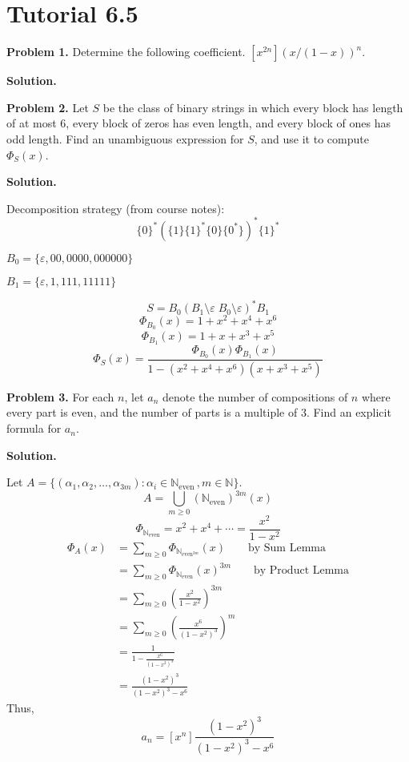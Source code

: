 \section{Tutorial 6.5}
\textbf{Problem 1.} Determine the following coefficient.
$ [x^{2n}](x/(1-x))^n $.

\textbf{Solution.}

\textbf{Problem 2.} Let $ S $ be the class of binary strings in which every
block has length of at most $ 6 $, every block of zeros has even length,
and every block of ones has odd length. Find an unambiguous expression for $ S $,
and use it to compute $ \Phi_S(x) $.

\textbf{Solution.}

Decomposition strategy (from course notes):
\[ \{0\}^*(\{1\}\{1\}^*\{0\}\{0^*\})^*\{1\}^* \]

$ B_0=\{\varepsilon,00,0000,000000\} $

$ B_1=\{\varepsilon, 1, 111, 11111\} $

\[ S=B_0(B_1\setminus \varepsilon\; B_0\setminus \varepsilon)^* B_1 \]
\[ \Phi_{B_0}(x)=1+x^2+x^4+x^6 \]
\[ \Phi_{B_1}(x)=1+x+x^3+x^5 \]
\[ \Phi_S(x)=\frac{\Phi_{B_0}(x)\Phi_{B_1}(x)}{1-(x^2+x^4+x^6)(x+x^3+x^5)} \]


\textbf{Problem 3.} For each $ n $, let $ a_n $ denote the number of compositions
of $ n $ where every part is even, and the number of parts is a multiple of $ 3 $.
Find an explicit formula for $ a_n $.

\textbf{Solution.}

Let $ A= \{(\alpha_1,\alpha_2,\ldots,\alpha_{3m}):
    \alpha_i\in\mathbb{N}_{\text{even}}\,, m\in\mathbb{N}\} $.
\[ A=\bigcup_{m\geqslant 0}(\mathbb{N}_{\text{even}})^{3m}(x) \]
\[ \Phi_{\mathbb{N}_{\text{even}}}=x^2+x^4+\cdots=\frac{x^2}{1-x^2} \]
\begin{align*}
    \Phi_A(x)
     & =\sum\limits_{m\geqslant 0} \Phi_{\mathbb{N}_{\text{even}^{3m}}}(x)
    \qquad\text{by Sum Lemma}                                              \\
     & =\sum\limits_{m\geqslant 0} \Phi_{\mathbb{N}_{\text{even}}}(x)^{3m}
    \qquad\text{by Product Lemma}                                          \\
     & =\sum\limits_{m\geqslant 0} \left( \frac{x^2}{1-x^2} \right)^{3m}   \\
     & =\sum\limits_{m\geqslant 0} \left( \frac{x^6}{(1-x^2)^3}  \right)^m \\
     & =\frac{1}{1-\frac{x^6}{(1-x^2)^3}}                                  \\
     & =\frac{(1-x^2)^3}{(1-x^2)^3-x^6}
\end{align*}
Thus,
\[ a_n=[x^n]\frac{(1-x^2)^3}{(1-x^2)^3-x^6} \]


